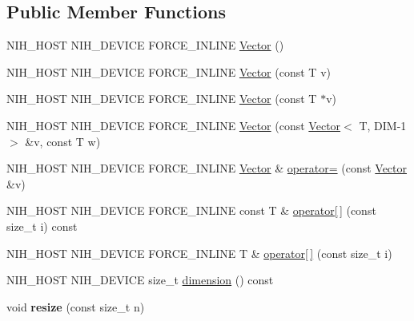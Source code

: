 \subsection*{\-Public \-Member \-Functions}
\begin{DoxyCompactItemize}
\item 
\-N\-I\-H\-\_\-\-H\-O\-S\-T \-N\-I\-H\-\_\-\-D\-E\-V\-I\-C\-E \-F\-O\-R\-C\-E\-\_\-\-I\-N\-L\-I\-N\-E \hyperlink{structnih_1_1_vector_af5110044ef547d0f5bc45a41bf6f969f}{\-Vector} ()
\item 
\-N\-I\-H\-\_\-\-H\-O\-S\-T \-N\-I\-H\-\_\-\-D\-E\-V\-I\-C\-E \-F\-O\-R\-C\-E\-\_\-\-I\-N\-L\-I\-N\-E \hyperlink{structnih_1_1_vector_a3129b3fa855de8ba4df656ea0bb72749}{\-Vector} (const \-T v)
\item 
\-N\-I\-H\-\_\-\-H\-O\-S\-T \-N\-I\-H\-\_\-\-D\-E\-V\-I\-C\-E \-F\-O\-R\-C\-E\-\_\-\-I\-N\-L\-I\-N\-E \hyperlink{structnih_1_1_vector_adbcc5ccb3416111f772f270d47b31286}{\-Vector} (const \-T $\ast$v)
\item 
\-N\-I\-H\-\_\-\-H\-O\-S\-T \-N\-I\-H\-\_\-\-D\-E\-V\-I\-C\-E \-F\-O\-R\-C\-E\-\_\-\-I\-N\-L\-I\-N\-E \hyperlink{structnih_1_1_vector_a6ffcf2ddc48e3b7f6386a8fdef1fb1f5}{\-Vector} (const \hyperlink{structnih_1_1_vector}{\-Vector}$<$ \-T, \-D\-I\-M-\/1 $>$ \&v, const \-T w)
\item 
\-N\-I\-H\-\_\-\-H\-O\-S\-T \-N\-I\-H\-\_\-\-D\-E\-V\-I\-C\-E \*
\-F\-O\-R\-C\-E\-\_\-\-I\-N\-L\-I\-N\-E \hyperlink{structnih_1_1_vector}{\-Vector} \& \hyperlink{structnih_1_1_vector_aa0d83cd139256485ae8f163d04386efc}{operator=} (const \hyperlink{structnih_1_1_vector}{\-Vector} \&v)
\item 
\-N\-I\-H\-\_\-\-H\-O\-S\-T \-N\-I\-H\-\_\-\-D\-E\-V\-I\-C\-E \*
\-F\-O\-R\-C\-E\-\_\-\-I\-N\-L\-I\-N\-E const \-T \& \hyperlink{structnih_1_1_vector_a96ed0e3cfa2e5a9985474673e4e8ac32}{operator\mbox{[}$\,$\mbox{]}} (const size\-\_\-t i) const 
\item 
\-N\-I\-H\-\_\-\-H\-O\-S\-T \-N\-I\-H\-\_\-\-D\-E\-V\-I\-C\-E \*
\-F\-O\-R\-C\-E\-\_\-\-I\-N\-L\-I\-N\-E \-T \& \hyperlink{structnih_1_1_vector_a6d5b57f8fead0871a221d43d5e44f5d4}{operator\mbox{[}$\,$\mbox{]}} (const size\-\_\-t i)
\item 
\-N\-I\-H\-\_\-\-H\-O\-S\-T \-N\-I\-H\-\_\-\-D\-E\-V\-I\-C\-E size\-\_\-t \hyperlink{structnih_1_1_vector_acc8500e147b270f614715c49b04e333b}{dimension} () const 
\item 
\hypertarget{structnih_1_1_vector_a46214e7d2368173ed373e5f366737e28}{
void {\bfseries resize} (const size\-\_\-t n)}
\label{structnih_1_1_vector_a46214e7d2368173ed373e5f366737e28}

\end{DoxyCompactItemize}
